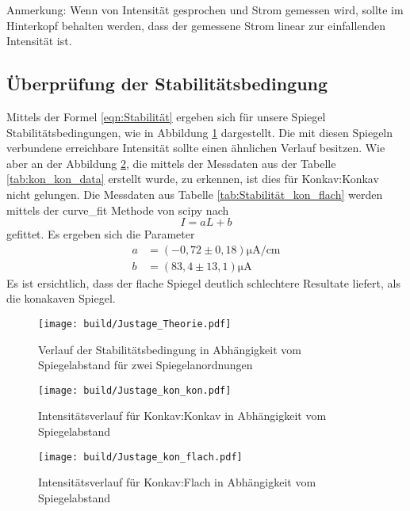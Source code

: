 Anmerkung: Wenn von Intensität gesprochen und Strom gemessen wird, sollte im Hinterkopf behalten werden, dass der gemessene Strom linear zur einfallenden Intensität ist.

\subsection{Überprüfung der Stabilitätsbedingung}
Mittels der Formel \eqref{eqn:Stabilität} ergeben sich für unsere Spiegel Stabilitätsbedingungen, wie in Abbildung \ref{fig:Stabilität_Theorie} dargestellt. 
Die mit diesen Spiegeln verbundene erreichbare Intensität sollte einen ähnlichen Verlauf besitzen.
Wie aber an der Abbildung \ref{fig:Stabilität_kon_kon}, die mittels der Messdaten aus der Tabelle
\ref{tab:kon_kon_data} erstellt wurde, zu erkennen, ist dies für Konkav:Konkav nicht gelungen.
Die Messdaten aus Tabelle \ref{tab:Stabilität_kon_flach} werden mittels der curve\_fit Methode von scipy \cite{scipy} nach
\begin{equation}
  I=aL+b
\end{equation}
gefittet. Es ergeben sich die Parameter
\begin{align}
  a&=(-0,72\pm 0,18)\si{\micro\ampere\per\centi\meter}\nonumber\\
  b&=(83,4\pm 13,1)\si{\micro\ampere}
\end{align}
Es ist ersichtlich, dass der flache Spiegel deutlich schlechtere Resultate liefert, als die konakaven Spiegel.


\begin{figure}
  \centering
  \texttt{[image: build/Justage\_Theorie.pdf]}
  \caption{Verlauf der Stabilitätsbedingung in Abhängigkeit vom Spiegelabstand für zwei Spiegelanordnungen}
  \label{fig:Stabilität_Theorie}
\end{figure}


\begin{figure}
  \centering
  \texttt{[image: build/Justage\_kon\_kon.pdf]}
  \caption{Intensitätsverlauf für Konkav:Konkav in Abhängigkeit vom Spiegelabstand}
  \label{fig:Stabilität_kon_kon}
\end{figure}

\begin{figure}
  \centering
  \texttt{[image: build/Justage\_kon\_flach.pdf]}
  \caption{Intensitätsverlauf für Konkav:Flach in Abhängigkeit vom Spiegelabstand}
  \label{fig:Stabilität_kon_flach}
\end{figure}

